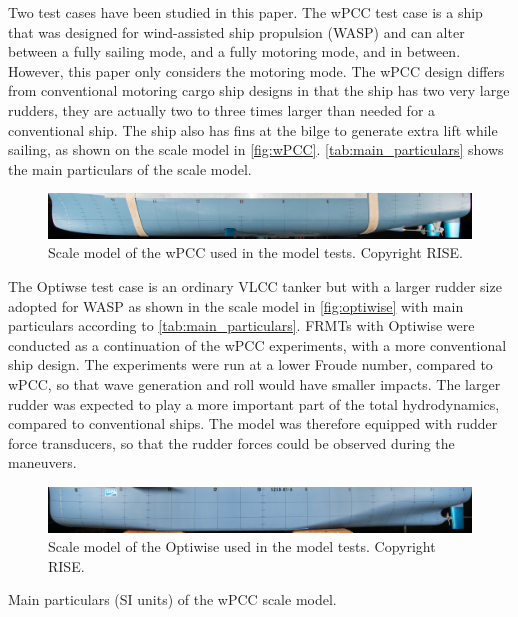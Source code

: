 Two test cases have been studied in this paper. The wPCC test case is a ship that was designed for wind-assisted ship propulsion (WASP) and can alter between a fully sailing mode, and a fully motoring mode, and in between. 
However, this paper only considers the motoring mode. The wPCC design differs from conventional motoring cargo ship designs in that the ship has two very large rudders, they are actually two to three times larger than needed for a conventional ship. The ship also has fins at the bilge to generate extra lift while sailing, as shown on the scale model in \autoref{fig:wPCC}.
\autoref{tab:main_particulars} shows the main particulars of the scale model. 
\begin{figure}[h]
    \centering
    \includegraphics[width=\columnwidth]{figures/5m2.jpg}
    \caption{Scale model of the wPCC used in the model tests. Copyright RISE.}
    \label{fig:wPCC}
\end{figure}

The Optiwse test case is an ordinary VLCC tanker but with a larger rudder size adopted for WASP as shown in the scale model in \autoref{fig:optiwise} with main particulars according to \autoref{tab:main_particulars}.
FRMTs with Optiwise were conducted as a continuation of the wPCC experiments, with a more conventional ship design. The experiments were run at a lower Froude number, compared to wPCC, so that wave generation and roll would have smaller impacts. The larger rudder was expected to play a more important part of the total hydrodynamics, compared to conventional ships. The model was therefore equipped with rudder force transducers, so that the rudder forces could be observed during the maneuvers. 
\begin{figure}[h]
    \centering
    \includegraphics[width=\columnwidth]{figures/optiwise.jpg}
    \caption{Scale model of the Optiwise used in the model tests. Copyright RISE.}
    \label{fig:optiwise}
\end{figure}
\begin{table}[h]
    \centering
    \caption{Main particulars (SI units) of the wPCC scale model.}
    \label{tab:main_particulars}
\end{table}